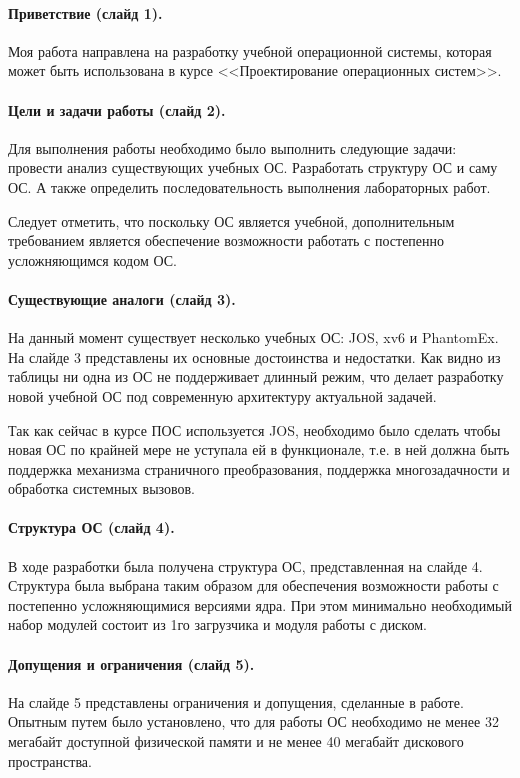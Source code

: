 \documentclass[12pt]{article}
\begin{document}
\paragraph{Приветствие (слайд 1).}
Моя работа направлена на разработку учебной операционной системы, которая может
быть использована в курсе <<Проектирование операционных систем>>.

\paragraph{Цели и задачи работы (слайд 2).}
Для выполнения работы необходимо было выполнить следующие задачи: провести
анализ существующих учебных ОС. Разработать структуру ОС и саму ОС. А также определить
последовательность выполнения лабораторных работ.

Следует отметить, что поскольку ОС является учебной, дополнительным требованием
является обеспечение возможности работать с постепенно усложняющимся кодом ОС.


\paragraph{Существующие аналоги (слайд 3).}
На данный момент существует несколько учебных ОС: JOS, xv6 и PhantomEx. На слайде 3
представлены их основные достоинства и недостатки. Как видно из таблицы ни одна из
ОС не поддерживает длинный режим, что делает разработку новой учебной ОС под современную
архитектуру актуальной задачей.

Так как сейчас в курсе ПОС используется JOS, необходимо было сделать чтобы новая ОС
по крайней мере не уступала ей в функционале, т.е. в ней должна быть поддержка
механизма страничного преобразования, поддержка многозадачности и обработка системных
вызовов.


\paragraph{Структура ОС (слайд 4).}
В ходе разработки была получена структура ОС, представленная на слайде 4.
Структура была выбрана таким образом для обеспечения возможности работы с постепенно
усложняющимися версиями ядра. При этом минимально необходимый набор модулей состоит из
1го загрузчика и модуля работы с диском.


\paragraph{Допущения и ограничения (слайд 5).}
На слайде 5 представлены ограничения и допущения, сделанные в работе. Опытным путем было установлено,
что для работы ОС необходимо не менее 32 мегабайт доступной физической памяти и не менее 40 мегабайт
дискового пространства.
\end{document}

